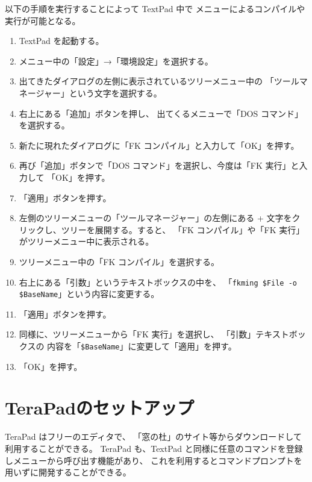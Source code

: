 \documentclass[a4paper]{jsarticle}
\begin{document}
以下の手順を実行することによって TextPad 中で
メニューによるコンパイルや実行が可能となる。
\begin{enumerate}
\item TextPad を起動する。

\item メニュー中の「設定」→「環境設定」を選択する。

\item 出てきたダイアログの左側に表示されているツリーメニュー中の
	「ツールマネージャー」という文字を選択する。

\item 右上にある「追加」ボタンを押し、
	出てくるメニューで「DOS コマンド」を選択する。

\item 新たに現れたダイアログに「FK コンパイル」と入力して「OK」を押す。

\item 再び「追加」ボタンで「DOS コマンド」を選択し、今度は「FK 実行」と入力して
	「OK」を押す。

\item 「適用」ボタンを押す。

\item 左側のツリーメニューの「ツールマネージャー」の左側にある
	+ 文字をクリックし、ツリーを展開する。すると、
	「FK コンパイル」や「FK 実行」がツリーメニュー中に表示される。

\item ツリーメニュー中の「FK コンパイル」を選択する。

\item  右上にある「引数」というテキストボックスの中を、
	「\verb+fkming $File -o $BaseName+」という内容に変更する。

\item  「適用」ボタンを押す。

\item  同様に、ツリーメニューから「FK 実行」を選択し、
	「引数」テキストボックスの
	内容を「\verb+$BaseName+」に変更して「適用」を押す。

\item 「OK」を押す。
\end{enumerate}

\section{TeraPadのセットアップ}
TeraPad はフリーのエディタで、
「窓の杜」のサイト等からダウンロードして利用することができる。
TeraPad も、TextPad と同様に任意のコマンドを登録しメニューから呼び出す機能があり、
これを利用するとコマンドプロンプトを用いずに開発することができる。
\end{document}

